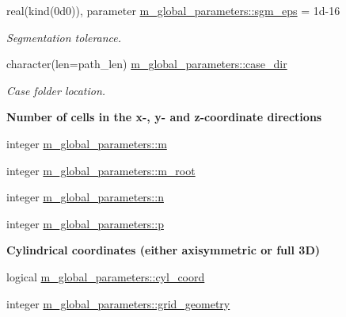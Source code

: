 \begin{Indent}
\begin{DoxyCompactItemize}
real(kind(0d0)), parameter \hyperlink{namespacem__global__parameters_aec97838cc58623019b07ae47da7f4c1c}{m\+\_\+global\+\_\+parameters\+::sgm\+\_\+eps} = 1d-\/16
\begin{DoxyCompactList}\small\item\em Segmentation tolerance. \end{DoxyCompactList}\item 
character(len=path\+\_\+len) \hyperlink{namespacem__global__parameters_a0b91e533fe3b3e112c42af4024014544}{m\+\_\+global\+\_\+parameters\+::case\+\_\+dir}
\begin{DoxyCompactList}\small\item\em Case folder location. \end{DoxyCompactList}\end{DoxyCompactItemize}
\end{Indent}
\begin{Indent}\textbf{ Number of cells in the x-\/, y-\/ and z-\/coordinate directions}\par
\begin{DoxyCompactItemize}
\item 
integer \hyperlink{namespacem__global__parameters_aee38c9d03e9195858a93ec611b605f33}{m\+\_\+global\+\_\+parameters\+::m}
\item 
integer \hyperlink{namespacem__global__parameters_afabaedf16b26e327635e956d13b45086}{m\+\_\+global\+\_\+parameters\+::m\+\_\+root}
\item 
integer \hyperlink{namespacem__global__parameters_ac72422e5f77149bd32cf0cfd01a36544}{m\+\_\+global\+\_\+parameters\+::n}
\item 
integer \hyperlink{namespacem__global__parameters_ac040dbf547e6d5de8df08e864d8131e7}{m\+\_\+global\+\_\+parameters\+::p}
\end{DoxyCompactItemize}
\end{Indent}
\begin{Indent}\textbf{ Cylindrical coordinates (either axisymmetric or full 3D)}\par
\begin{DoxyCompactItemize}
\item 
logical \hyperlink{namespacem__global__parameters_a53f0d5eed7783c9760aaeeaa0abbd58c}{m\+\_\+global\+\_\+parameters\+::cyl\+\_\+coord}
\item 
integer \hyperlink{namespacem__global__parameters_a0f2d413d9739928f8e1a98f0a5783ab9}{m\+\_\+global\+\_\+parameters\+::grid\+\_\+geometry}
\end{DoxyCompactItemize}
\end{Indent}
